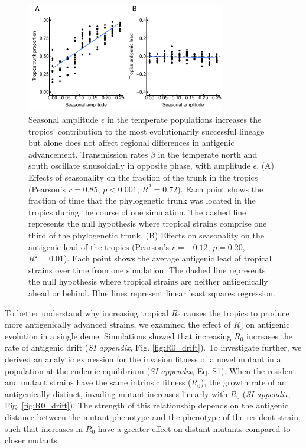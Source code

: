 \documentclass[10pt]{article}
\begin{document}
\begin{figure}[h!]
\centerline{\includegraphics[width=3.42in]{./manuscript/figures/seasonality/seasonality.pdf}}
\caption{Seasonal amplitude $\epsilon$ in the temperate populations increases the tropics' contribution to the most evolutionarily successful lineage but alone does not affect regional differences in antigenic advancement. 
Transmission rates $\beta$ in the temperate north and south oscillate sinusoidally in opposite phase, with amplitude $\epsilon$. 
(A) Effects of seasonality on the fraction of the trunk in the tropics (Pearson's $r = 0.85$, $p < 0.001$; $R^2 = 0.72$). 
Each point shows the fraction of time that the phylogenetic trunk was located in the tropics during the course of one simulation. 
The dashed line represents the null hypothesis where tropical strains comprise one third of the phylogenetic trunk. 
(B) Effects on seasonality on the antigenic lead of the tropics (Pearson's $r = -0.12$, $p = 0.20$, $R^2 = 0.01$). 
Each point shows the average antigenic lead of tropical strains over time from one simulation. 
The dashed line represents the null hypothesis where tropical strains are neither antigenically ahead or behind. 
Blue lines represent linear least squares regression.}
\label{fig:seasonality}
\end{figure}

To better understand why increasing tropical $R_0$ causes the tropics to produce more antigenically advanced strains, we examined the effect of $R_0$ on antigenic evolution in a single deme.
Simulations showed that increasing $R_0$ increases the rate of antigenic drift (\textit{SI appendix}, Fig. \ref{fig:R0_drift}).
To investigate further, we derived an analytic expression for the invasion fitness of a novel mutant in a population at the endemic equilibrium (\textit{SI appendix}, Eq. S1).
When the resident and mutant strains have the same intrinsic fitness ($R_0$), the growth rate of an antigenically distinct, invading mutant increases linearly with $R_0$ (\textit{SI appendix}, Fig. \ref{fig:R0_drift}).
The strength of this relationship depends on the antigenic distance between the mutant phenotype and the phenotype of the resident strain, such that increases in $R_0$ have a greater effect on distant mutants compared to closer mutants.
\end{document}
